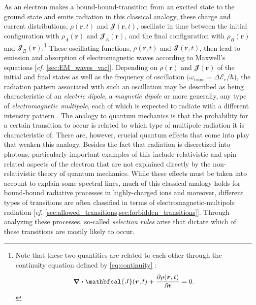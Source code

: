 As an electron makes a bound-bound-transition from an excited state to the ground state and emits radiation in this classical analogy, these charge and current distributions, $\rho(\mathbold{r},t)$ and $\mathbfcal{J} (\mathbold{r},t)$, oscillate in time between the initial configuration with $\rho_A (\mathbold{r})$ and $\mathbfcal{J}_A (\mathbold{r})$, and the final configuration with $\rho_B (\mathbold{r})$ and $\mathbfcal{J}_B (\mathbold{r})$.\footnote{Note that these two quantities are related to each other through the continuity equation defined by \cref{eq:continuity} \cite{Landau60,Jackson75,Griffiths17,Griffiths05}:
\begin{equation*}
 \div \mathbfcal{J} (\mathbold{r},t) + \pdv{\rho(\mathbold{r},t)}{t} = 0 .
 \end{equation*}}
These oscillating functions, $\rho(\mathbold{r},t)$ and $\mathbfcal{J} (\mathbold{r},t)$, then lead to emission and absorption of electromagnetic waves according to Maxwell's equations [\emph{cf.\@} \cref{sec:EM_waves_vac}]. 
Depending on $\rho (\mathbold{r})$ and $\mathbfcal{J} (\mathbold{r})$ of the initial and final states as well as the frequency of oscillation $(\omega_{\text{trans}} = \Delta \mathcal{E}_e / \hbar$), the radiation pattern associated with such an oscillation may be described as being characteristic of an \emph{electric dipole}, a \emph{magnetic dipole} or more generally, any type of \emph{electromagnetic multipole}, each of which is expected to radiate with a different intensity pattern \cite{Kahn02}. 
The analogy to quantum mechanics is that the probability for a certain transition to occur is related to which type of multipole radiation it is characteristic of. 
There are, however, crucial quantum effects that come into play that weaken this analogy. 
Besides the fact that radiation is discretized into photons, particularly important examples of this include relativistic and spin-related aspects of the electron that are not explained directly by the non-relativistic theory of quantum mechanics.  
While these effects must be taken into account to explain some spectral lines, much of this classical analogy holds for bound-bound radiative processes in highly-charged ions and moreover, different types of transitions are often classified in terms of electromagnetic-multipole radiation [\emph{cf.\@} \cref{sec:allowed_transitions,sec:forbidden_transitions}]. 
Through analyzing these processes, so-called \emph{selection rules} arise that dictate which of these transitions are mostly likely to occur. 

